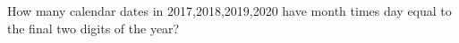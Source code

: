 How many calendar dates in 2017,2018,2019,2020 have month times day equal to the final two digits of the year?
